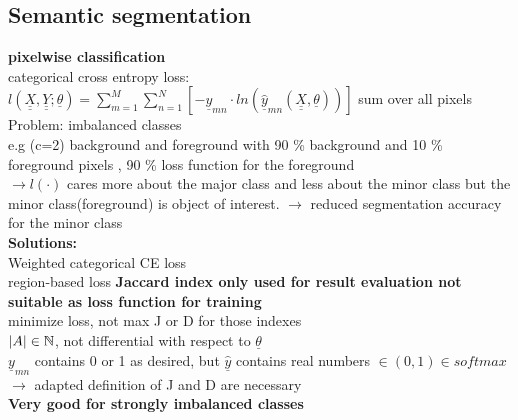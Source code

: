 \subsection{Semantic segmentation }
\textbf{pixelwise classification }\\
categorical cross entropy loss: \\
$  l(\underline{\underline{X}} , \underline{\underline{Y}}; \underline{\theta}) = \sum_{m=1}^{M} \sum_{n=1}^{N}[- \underline{y}_{mn} \cdot ln (\hat{\underline{y}}_{mn} ( \underline{\underline{X}}, \underline{\theta} )) ] $
sum over all pixels\\
Problem: imbalanced classes \\
e.g (c=2) background and foreground with 90 \% background and 10 \% foreground pixels , 90 \% loss function for the foreground \\
$\rightarrow l(\cdot)$ cares more about the major class and less about the minor class but the minor class(foreground) is object of interest. 
$\rightarrow$ reduced segmentation accuracy for the minor class \\
\textbf{Solutions:} \\
\textbullet Weighted categorical CE loss \\
\textbullet region-based loss 
\textbf{Jaccard index only used for result evaluation not suitable as loss function for training}\\
\textbullet minimize loss, not max J or D for those indexes\\
\textbullet $ |A|  \in \mathbb N$, not differential with respect to $ \underline{\theta} $\\
\textbullet $ \underline{y}_{mn} $ contains 0 or 1 as desired, but $ \hat{\underline{y}}  $ contains real numbers $ \in (0,1) \in softmax $ \\
$\rightarrow$ adapted definition of J and D are necessary \\
\textbf{Very good for strongly imbalanced classes }
